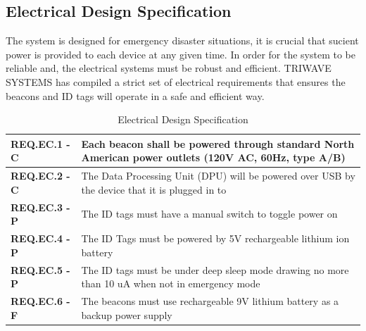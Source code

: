 \pagebreak
\subsection{Electrical Design Specification}
\medskip
The system is designed for emergency disaster situations, it is crucial that sucient power is provided to each device at any given time. In order for the system to be reliable and, the electrical systems must be robust and efficient. TRIWAVE SYSTEMS has compiled a strict set of electrical requirements that ensures the beacons and ID tags will operate in a safe and efficient way.
\medskip
\bgroup
\def\arraystretch{1.5}
\begin{table}[H]
\centering
\begin{tabular}{ | m{3cm} | m{12.5cm} |}
\hline
\textbf{REQ.EC.1 - C} &  Each beacon shall be powered through standard North American power outlets (120V AC, 60Hz, type A/B)\\
\hline
\textbf{REQ.EC.2 - C} &  The Data Processing Unit (DPU) will be powered over USB by the device that it is plugged in to\\
\hline
\textbf{REQ.EC.3 - P} &  The ID tags must have a manual switch to toggle power on \\
\hline
\textbf{REQ.EC.4 - P} &  The ID Tags must be powered by 5V rechargeable lithium ion battery\\
\hline
\textbf{REQ.EC.5 - P} &  The ID tags must be under deep sleep mode drawing no more than 10 uA when not in emergency mode\\
\hline
\textbf{REQ.EC.6 - F} &  The beacons must use rechargeable 9V lithium battery as a backup power supply\\
\hline
\end{tabular}
\caption{Electrical Design Specification}
\end{table}
